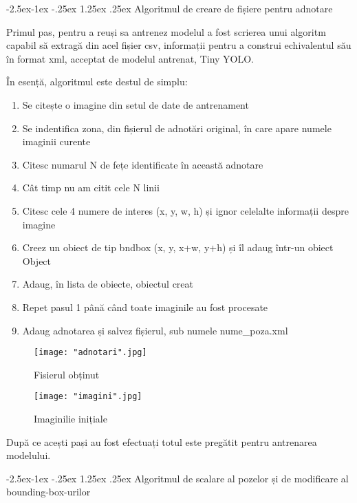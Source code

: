 \documentclass[a4paper, 12pt]{article}
\makeatletter
\renewcommand\paragraph{\@startsection{paragraph}{4}{\z@}%
	{-2.5ex\@plus -1ex \@minus -.25ex}%
	{1.25ex \@plus .25ex}%
	{\normalfont\normalsize\bfseries}}
\makeatother
\begin{document}
	\paragraph{Algoritmul de creare de fișiere pentru adnotare}
	
	\quad\space Primul pas, pentru a reuși sa antrenez modelul a fost scrierea unui algoritm capabil să extragă din acel fișier csv, informații pentru a construi echivalentul său în format xml,  acceptat de modelul antrenat, Tiny YOLO.
	\bigskip
	
	În esență, algoritmul este destul de simplu:
	\begin{enumerate}
		\item Se citește o imagine din setul de date de antrenament
		\item Se indentifica zona, din fișierul de adnotări original, în care apare numele imaginii curente
		\item Citesc numarul N de fețe identificate în această adnotare
		\item Cât timp nu am citit cele N linii
		\item Citesc cele 4 numere de interes (x, y, w, h) și ignor celelalte informații despre imagine
		\item Creez un obiect de tip bndbox (x, y, x+w, y+h) și îl adaug într-un obiect Object 
		\item Adaug, în lista de obiecte, obiectul creat 
		\item Repet pasul 1 până când toate imaginile au fost procesate
		\item Adaug adnotarea și salvez fișierul, sub numele nume\_poza.xml
	\end{enumerate}
	
	
	\begin{figure}[H]
		\begin{minipage}{0.48\textwidth}
			\centering
			\texttt{[image: "adnotari".jpg]}
			\caption{Fisierul obținut}\label{fig:adnotari}
		\end{minipage}\hfill
		\begin{minipage}{0.48\textwidth}
			\centering
			\texttt{[image: "imagini".jpg]}
			\caption{Imaginilie inițiale}\label{fig:imagini}
		\end{minipage}\hfill
	\end{figure} 
	
	După ce acești pași au fost efectuați totul este pregătit pentru antrenarea modelului.
	
	
	\paragraph{Algoritmul de scalare al pozelor și de modificare al bounding-box-urilor}
	
\end{document}
